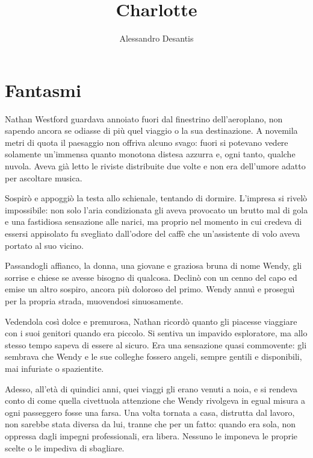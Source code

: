 \documentclass[a4paper,oneside,11pt]{memoir}
\title{Charlotte}
\author{Alessandro Desantis}
\date{}
\begin{document}
\begin{titlingpage}
\maketitle
\end{titlingpage}

\chapter{Fantasmi}

Nathan Westford guardava annoiato fuori dal finestrino dell'aeroplano, non
sapendo ancora se odiasse di più quel viaggio o la sua destinazione. A novemila
metri di quota il paesaggio non offriva alcuno svago: fuori si potevano vedere
solamente un'immensa quanto monotona distesa azzurra e, ogni tanto, qualche
nuvola. Aveva già letto le riviste distribuite due volte e non era dell'umore
adatto per ascoltare musica.

Sospirò e appoggiò la testa allo schienale, tentando di dormire. L'impresa si
rivelò impossibile: non solo l'aria condizionata gli aveva provocato un brutto
mal di gola e una fastidiosa sensazione alle narici, ma proprio nel momento in
cui credeva di essersi appisolato fu svegliato dall'odore del caffè che
un'assistente di volo aveva portato al suo vicino.

Passandogli affianco, la donna, una giovane e graziosa bruna di nome Wendy, gli
sorrise e chiese se avesse bisogno di qualcosa. Declinò con un cenno del capo ed
emise un altro sospiro, ancora più doloroso del primo. Wendy annuì e proseguì
per la propria strada, muovendosi sinuosamente.

Vedendola così dolce e premurosa, Nathan ricordò quanto gli piacesse viaggiare
con i suoi genitori quando era piccolo. Si sentiva un impavido esploratore, ma
allo stesso tempo sapeva di essere al sicuro. Era una sensazione quasi
commovente: gli sembrava che Wendy e le sue colleghe fossero angeli, sempre
gentili e disponibili, mai infuriate o spazientite.

Adesso, all'età di quindici anni, quei viaggi gli erano venuti a noia, e si
rendeva conto di come quella civettuola attenzione che Wendy rivolgeva in egual
misura a ogni passeggero fosse una farsa. Una volta tornata a casa, distrutta
dal lavoro, non sarebbe stata diversa da lui, tranne che per un fatto: quando
era sola, non oppressa dagli impegni professionali, era libera. Nessuno le
imponeva le proprie scelte o le impediva di sbagliare.
\end{document}
